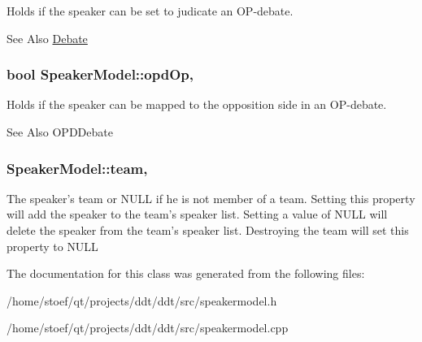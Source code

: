 Holds if the speaker can be set to judicate an O\-P-\/debate. \begin{DoxySeeAlso}{See Also}
\hyperlink{classDebate}{Debate} 
\end{DoxySeeAlso}
\hypertarget{classSpeakerModel_a60ebe1609153ba734e8d5449643cd85e}{
\subsubsection[{opd\-Op}]{\setlength{\rightskip}{0pt plus 5cm}bool Speaker\-Model\-::opd\-Op\hspace{0.3cm}{\ttfamily [read]}, {\ttfamily [write]}}}\label{classSpeakerModel_a60ebe1609153ba734e8d5449643cd85e}
Holds if the speaker can be mapped to the opposition side in an O\-P-\/debate. \begin{DoxySeeAlso}{See Also}
O\-P\-D\-Debate 
\end{DoxySeeAlso}
\hypertarget{classSpeakerModel_a2b6725ebf62712e76c559443426144b1}{
\subsubsection[{team}]{ Speaker\-Model\-::team\hspace{0.3cm}{\ttfamily [read]}, {\ttfamily [write]}}}\label{classSpeakerModel_a2b6725ebf62712e76c559443426144b1}
The speaker's team or {\ttfamily N\-U\-L\-L} if he is not member of a team. Setting this property will add the speaker to the team's speaker list. Setting a value of {\ttfamily N\-U\-L\-L} will delete the speaker from the team's speaker list. Destroying the team will set this property to {\ttfamily N\-U\-L\-L} 

The documentation for this class was generated from the following files\-:\begin{DoxyCompactItemize}
\item 
/home/stoef/qt/projects/ddt/ddt/src/speakermodel.\-h\item 
/home/stoef/qt/projects/ddt/ddt/src/speakermodel.\-cpp\end{DoxyCompactItemize}
